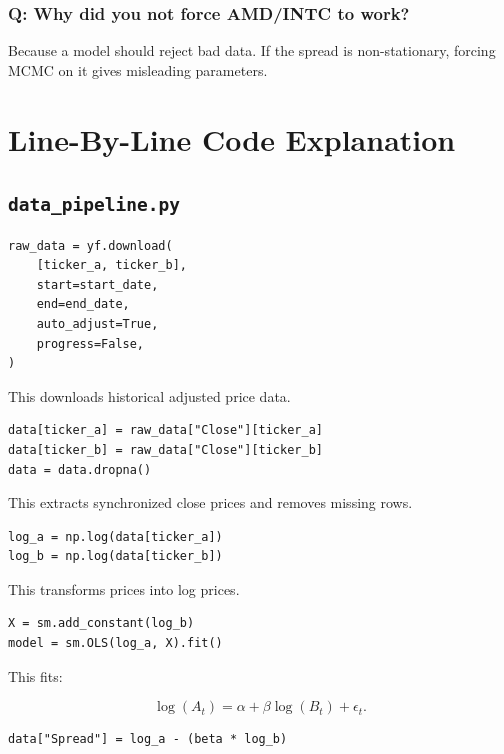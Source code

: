 \documentclass[11pt]{article}
\newcommand{\code}[1]{\texttt{#1}}
\begin{document}
\subsubsection{Q: Why did you not force AMD/INTC to work?}

Because a model should reject bad data. If the spread is non-stationary, forcing
MCMC on it gives misleading parameters.

\section{Line-By-Line Code Explanation}

\subsection{\code{data\_pipeline.py}}

\begin{lstlisting}[style=pythonstyle]
raw_data = yf.download(
    [ticker_a, ticker_b],
    start=start_date,
    end=end_date,
    auto_adjust=True,
    progress=False,
)
\end{lstlisting}

This downloads historical adjusted price data.

\begin{lstlisting}[style=pythonstyle]
data[ticker_a] = raw_data["Close"][ticker_a]
data[ticker_b] = raw_data["Close"][ticker_b]
data = data.dropna()
\end{lstlisting}

This extracts synchronized close prices and removes missing rows.

\begin{lstlisting}[style=pythonstyle]
log_a = np.log(data[ticker_a])
log_b = np.log(data[ticker_b])
\end{lstlisting}

This transforms prices into log prices.

\begin{lstlisting}[style=pythonstyle]
X = sm.add_constant(log_b)
model = sm.OLS(log_a, X).fit()
\end{lstlisting}

This fits:

\[
\log(A_t)=\alpha+\beta\log(B_t)+\epsilon_t.
\]

\begin{lstlisting}[style=pythonstyle]
data["Spread"] = log_a - (beta * log_b)
\end{lstlisting}
\end{document}
